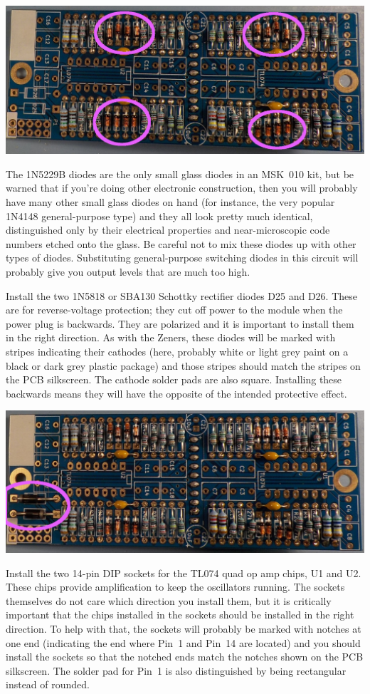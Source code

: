 \noindent\includegraphics[width=\linewidth]{zenerC.jpg}

The 1N5229B diodes are the only small glass diodes in an MSK~010 kit, but be
warned that if you're doing other electronic construction, then you will
probably have many other small glass diodes on hand (for instance, the very
popular 1N4148 general-purpose type) and they all look pretty much
identical, distinguished only by their electrical properties and
near-microscopic code numbers etched onto the glass.  Be careful not to mix
these diodes up with other types of diodes.  Substituting general-purpose
switching diodes in this circuit will probably give you output levels that
are much too high.

Install the two 1N5818 or SBA130 Schottky rectifier diodes D25 and D26. 
These are for reverse-voltage protection; they cut off power to the module
when the power plug is backwards.  They are polarized and it is important to
install them in the right direction.  As with the Zeners, these diodes will
be marked with stripes indicating their cathodes (here, probably white or
light grey paint on a black or dark grey plastic package) and those stripes
should match the stripes on the PCB silkscreen.  The cathode solder pads are
also square.  Installing these backwards means they will have the opposite
of the intended protective effect.

\noindent\includegraphics[width=\linewidth]{schottkyC.jpg}

Install the two 14-pin DIP sockets for the TL074 quad op amp chips, U1 and
U2.  These chips provide amplification to keep the oscillators running.  The
sockets themselves do not care which direction you install them, but it is
critically important that the chips installed in the sockets should be
installed in the right direction.  To help with that, the sockets will
probably be marked with notches at one end (indicating the end where Pin~1
and Pin~14 are located) and you should install the sockets so that the
notched ends match the notches shown on the PCB silkscreen.  The solder pad
for Pin~1 is also distinguished by being rectangular instead of rounded.

